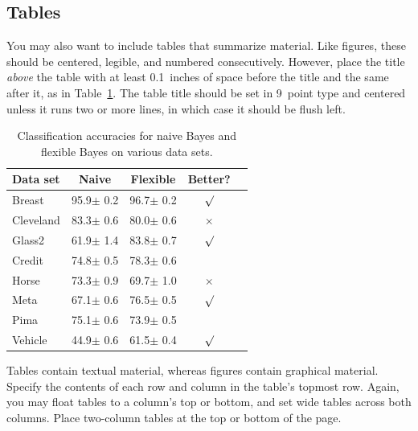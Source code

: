 \documentclass{article}
\begin{document}
\subsection{Tables}

You may also want to include tables that summarize material. Like
figures, these should be centered, legible, and numbered consecutively.
However, place the title \emph{above} the table with at least
0.1~inches of space before the title and the same after it, as in
Table~\ref{sample-table}. The table title should be set in 9~point
type and centered unless it runs two or more lines, in which case it
should be flush left.


\begin{table}[t]
\caption{Classification accuracies for naive Bayes and flexible
Bayes on various data sets.}
\label{sample-table}
\vskip 0.15in
\begin{center}
\begin{small}
\begin{sc}
\begin{tabular}{lcccr}
\toprule
Data set & Naive & Flexible & Better? \\
\midrule
Breast    & 95.9$\pm$ 0.2& 96.7$\pm$ 0.2& $\surd$ \\
Cleveland & 83.3$\pm$ 0.6& 80.0$\pm$ 0.6& $\times$\\
Glass2    & 61.9$\pm$ 1.4& 83.8$\pm$ 0.7& $\surd$ \\
Credit    & 74.8$\pm$ 0.5& 78.3$\pm$ 0.6&         \\
Horse     & 73.3$\pm$ 0.9& 69.7$\pm$ 1.0& $\times$\\
Meta      & 67.1$\pm$ 0.6& 76.5$\pm$ 0.5& $\surd$ \\
Pima      & 75.1$\pm$ 0.6& 73.9$\pm$ 0.5&         \\
Vehicle   & 44.9$\pm$ 0.6& 61.5$\pm$ 0.4& $\surd$ \\
\bottomrule
\end{tabular}
\end{sc}
\end{small}
\end{center}
\vskip -0.1in
\end{table}

Tables contain textual material, whereas figures contain graphical material.
Specify the contents of each row and column in the table's topmost
row. Again, you may float tables to a column's top or bottom, and set
wide tables across both columns. Place two-column tables at the
top or bottom of the page.
\end{document}
